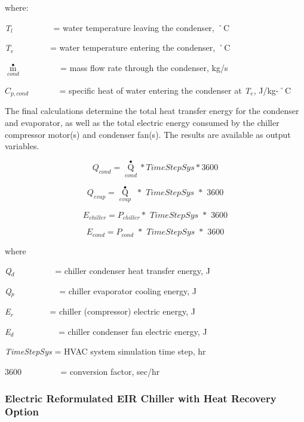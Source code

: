 where:

\emph{T\(_{l}\)}~~~~~~~~~ = water temperature leaving the condenser, ˚C

\emph{T\(_{e}\)}~~~~~~~~ = water temperature entering the condenser, ˚C

\({\mathop m\limits^ \bullet_{cond}}\) ~~~~~~~~ = mass flow rate through the condenser, kg/s

\({C_{p,cond}}\) ~~~~~~ = specific heat of water entering the condenser at \emph{T\(_{e}\)}, J/kg-˚C

The final calculations determine the total heat transfer energy for the condenser and evaporator, as well as the total electric energy consumed by the chiller compressor motor(s) and condenser fan(s). The results are available as output variables.

\begin{equation}
{Q_{cond}} = {\mathop Q\limits^ \bullet_{cond}}*TimeStepSys*3600
\end{equation}

\begin{equation}
{Q_{evap}} = {\mathop Q\limits^ \bullet_{evap}}\,\,*\,\,TimeStepSys\,\,*\,\,3600
\end{equation}

\begin{equation}
{E_{chiller}} = {P_{chiller}}*\,\,TimeStepSys\,\,*\,\,3600
\end{equation}

\begin{equation}
{E_{cond}} = {P_{cond}}\,\, * \,\,TimeStepSys\,\,*\,\,3600
\end{equation}

where

\emph{Q\(_{d}\)}~~~~~~~~~ = chiller condenser heat transfer energy, J

\emph{Q\(_{p}\)}~~~~~~~~~~ = chiller evaporator cooling energy, J

\emph{E\(_{r}\)}~~~~~~~~ = chiller (compressor) electric energy, J

\emph{E\(_{d}\)}~~~~~~~~~~ = chiller condenser fan electric energy, J

\emph{TimeStepSys} = HVAC system simulation time step, hr

\(3600\) ~~~~~~~~ = conversion factor, sec/hr

\subsubsection{Electric Reformulated EIR Chiller with Heat Recovery Option}\label{electric-reformulated-eir-chiller-with-heat-recovery-option}

